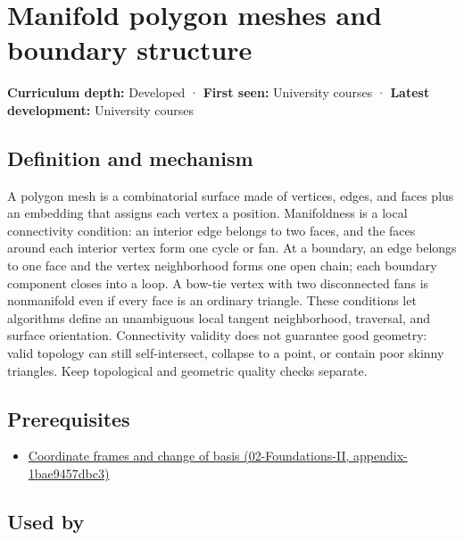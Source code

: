 \hypertarget{appendix-fab348609369}{}
\section{Manifold polygon meshes and boundary structure}\label{appendix-fab348609369-manifold-polygon-meshes-and-boundary-structure}

\textbf{Curriculum depth:} Developed · \textbf{First seen:} University courses · \textbf{Latest development:} University courses

\subsection{Definition and mechanism}\label{appendix-fab348609369-definition-and-mechanism}

A polygon mesh is a combinatorial surface made of vertices, edges, and faces plus an embedding that assigns each vertex a position. Manifoldness is a local connectivity condition: an interior edge belongs to two faces, and the faces around each interior vertex form one cycle or fan. At a boundary, an edge belongs to one face and the vertex neighborhood forms one open chain; each boundary component closes into a loop. A bow-tie vertex with two disconnected fans is nonmanifold even if every face is an ordinary triangle. These conditions let algorithms define an unambiguous local tangent neighborhood, traversal, and surface orientation. Connectivity validity does not guarantee good geometry: valid topology can still self-intersect, collapse to a point, or contain poor skinny triangles. Keep topological and geometric quality checks separate.

\subsection{Prerequisites}\label{appendix-fab348609369-prerequisites}

\begin{itemize}
\tightlist
\item
  \href{../02-Foundations-II/main.pdf\#nameddest=appendix-1bae9457dbc3}{Coordinate frames and change of basis (02-Foundations-II, appendix-1bae9457dbc3)}
\end{itemize}

\subsection{Used by}\label{appendix-fab348609369-used-by}

